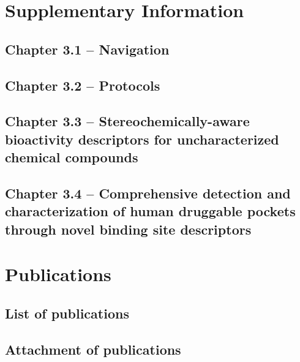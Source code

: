 \titleformat{\section}[block]
  {\normalfont\LARGE\bfseries}{\thesection}{1em}{}


\chapter{Supplementary Information}
\newpage

\section{Chapter 3.1 -- Navigation}
\section{Chapter 3.2 -- Protocols}

\clearpage
\section{Chapter 3.3 -- Stereochemically-aware bioactivity descriptors for uncharacterized chemical compounds}


\clearpage
\section{Chapter 3.4 -- Comprehensive detection and characterization of human druggable pockets through novel binding site descriptors}




\chapter{Publications}
\newpage
\section{List of publications}
\section{Attachment of publications}

